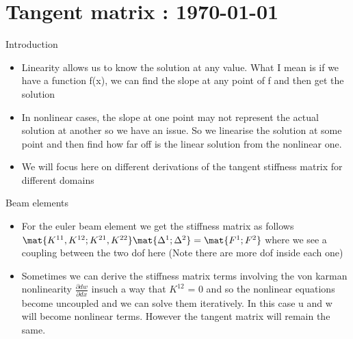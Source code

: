 




	\tableofcontents

\section{Tangent matrix : \today}
	\begin{frame}{Introduction}
		\begin{itemize}
			\item Linearity allows us to know the solution at any value. What I mean is if we have a function f(x), we can find the slope at any point of f and then get the solution
			\item In nonlinear cases, the slope at one point may not represent the actual solution at another so we have an issue. So we linearise the solution at some point and then find how far off is the linear solution from the nonlinear one. 
			\item We will focus here on different derivations of the tangent stiffness matrix for different domains	
		\end{itemize}
	\end{frame}
		
		
	\begin{frame}{Beam elements}
		\begin{itemize}
			\item For the euler beam element we get the stiffness matrix as follows  \\
			$\mat{K^{11},K^{12} ; K^{21},K^{22}} \mat{\Delta^1 ; \Delta^2} = \mat{F^1 ; F^2}$
			where we see a coupling between the two dof here (Note there are more dof inside each one)
			\item Sometimes we can derive the stiffness matrix terms involving the von karman nonlinearity $ \frac{\partial dw}{\partial dx}$ insuch a way that $K^{12}$ = 0 and so the nonlinear equations become uncoupled and we can solve them iteratively. In this case u and w will become nonlinear terms. 
			However the tangent matrix will remain the same.
		\end{itemize}
	\end{frame}	


